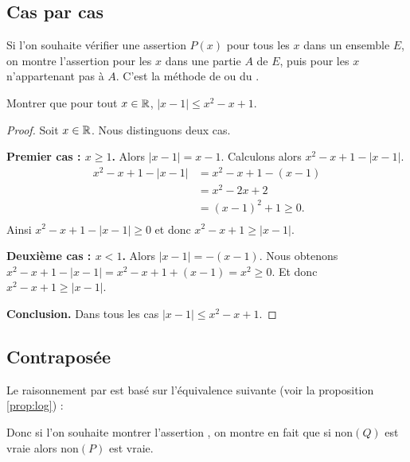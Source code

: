 \documentclass[11pt,class=report,crop=false]{standalone}
\begin{document}
\subsection{Cas par cas}

Si l'on souhaite vérifier une assertion $P(x)$ pour tous les $x$ dans un ensemble $E$, on
montre l'assertion pour les $x$ dans une partie $A$ de $E$, puis pour les $x$
n'appartenant pas à $A$. C'est la méthode de  ou du .

\begin{exemple}
Montrer que pour tout $x\in \mathbb{R}$, $|x-1| \le x^2-x+1$.

\begin{proof}
Soit $x \in \mathbb{R}$. Nous distinguons deux cas.

\textbf{Premier cas : $x \ge 1$.}
Alors $|x-1|=x-1$. Calculons alors $x^2-x+1 - |x-1|$.
\begin{align*}
 x^2-x+1 - |x-1|
   &= x^2-x+1 - (x-1) \\
   &= x^2 -2x + 2 \\
   &= (x-1)^2 + 1 \ge 0. \\
\end{align*}
Ainsi $x^2-x+1 - |x-1| \ge 0$ et donc $x^2-x+1 \ge |x-1|$.

\textbf{Deuxième cas : $x < 1$.}
Alors $|x-1| = -(x-1)$.
Nous obtenons $x^2-x+1 - |x-1|
= x^2-x+1 + (x-1) = x^2 \ge 0$. Et donc $x^2-x+1 \ge |x-1|$.


\textbf{Conclusion.} Dans tous les cas $|x-1| \le x^2-x+1$.
\end{proof}
\end{exemple}

\subsection{Contraposée}

Le raisonnement par  est basé sur l'équivalence suivante (voir la proposition \ref{prop:log}) :

Donc si l'on souhaite montrer l'assertion , on montre en fait
que si $\text{non}(Q)$ est vraie alors $\text{non}(P)$ est vraie.
\end{document}
